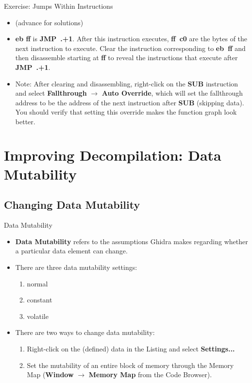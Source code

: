 \documentclass{beamer}
\begin{document}
\begin{frame}
\begin{block}{Exercise: Jumps Within Instructions}
\begin{itemize}
\item[] (advance for solutions)
\pause
\item \textbf{eb ff} is \textbf{JMP~.+1}.  After this instruction executes, \textbf{ff~c0} are the bytes of the next instruction to execute.  Clear the 
instruction corresponding to \textbf{eb~ff} and then disassemble starting at \textbf{ff} to reveal the instructions that execute after \textbf{JMP~.+1}.
\item Note: After clearing and disassembling, right-click on the \textbf{SUB} instruction and select \textbf{Fallthrough} $\rightarrow$ \textbf{Auto Override}, which
will set the fallthrough address to be the address of the next instruction after \textbf{SUB} (skipping data).  You should verify that setting this override makes
the function graph look better.
\end{itemize}
\end{block}
\end{frame}

\section{Improving Decompilation: Data Mutability}

\subsection{Changing Data Mutability}

\begin{frame}
\begin{block}{Data Mutability}
\begin{itemize}
\item \textbf{Data Mutability} refers to the assumptions Ghidra makes regarding whether a particular data element can change.
\item There are three data mutability settings:
\begin{enumerate}
\item normal
\item constant
\item volatile
\end{enumerate}
\item There are two ways to change data mutability:
\begin{enumerate}
\item Right-click on the (defined) data in the Listing and select \textbf{Settings...} 
\item Set the mutability of an entire block of memory through the Memory Map (\textbf{Window} $\rightarrow$ \textbf{Memory Map} from the Code Browser).
\end{enumerate}
\end{itemize}
\end{block}
\end{frame}
\end{document}
